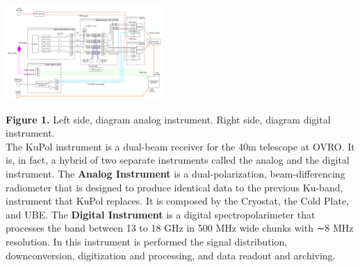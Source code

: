 \documentclass[a0paper,portrait]{baposter}
\begin{document}
\begin{poster}
{\begin{center}
\hspace{0.2cm}
\includegraphics [height=36mm, width=60mm] {KuPol_Digital.pdf}
\end{center}
\textbf{Figure 1.} Left side, diagram analog instrument. Right side, diagram digital instrument.\\
\small{The KuPol instrument is a dual-beam receiver for the 40m telescope at OVRO. It is, in fact, a hybrid of two separate instruments called the analog and the digital instrument. The \textbf{Analog Instrument} is a dual-polarization, beam-differencing radiometer that is designed to produce identical data to the previous Ku-band, instrument that KuPol replaces. It is composed by the Cryostat, the Cold Plate, and UBE. The \textbf{Digital Instrument} is a digital spectropolarimeter that processes the band between 13 to 18 GHz in 500 MHz wide chunks with ∼8 MHz resolution. In this instrument is performed the signal distribution, downconversion, digitization and processing, and data readout and archiving.}

}
\end{poster}
\end{document}
